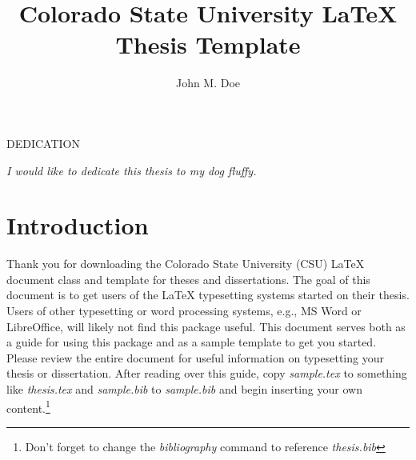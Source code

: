 \documentclass[master]{thesis}
\title{Colorado State University LaTeX Thesis Template}
\author{John M. Doe}
\begin{document}

\frontmatter %

\maketitle              %
\makemycopyright        %
\makeabstract           %
\makeacknowledgements   %

\begin{flatcenter} %

    DEDICATION

    \vfill %

    \noindent \textit{I would like to dedicate this thesis to my dog fluffy.}
    \vfill %
\end{flatcenter}
\newpage

\tableofcontents    %
\listoftables       %
\listoffigures      %

\mainmatter %

\chapter{Introduction}
\label{chap:intro}

Thank you for downloading the Colorado State University (CSU) \LaTeX{} document class and template for theses and dissertations.  The goal of this document is to get users of the \LaTeX{} typesetting systems started on their thesis. Users of other typesetting or word processing systems, e.g., MS Word or LibreOffice, will likely not find this package useful.  This document serves both as a guide for using this package and as a sample template to get you started.  Please review the entire document for useful information on typesetting your thesis or dissertation.  After reading over this guide, copy \textit{sample.tex} to something like \textit{thesis.tex} and \textit{sample.bib} to \textit{sample.bib} and begin inserting your own content.\footnote{Don't forget to change the \textit{bibliography} command to reference \textit{thesis.bib}}
\end{document}
